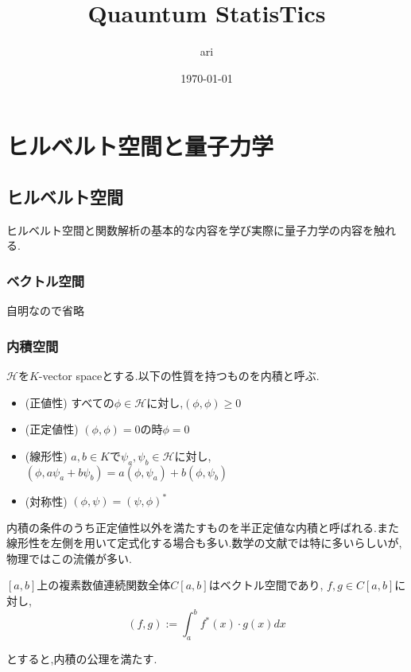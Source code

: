 \documentclass[uplatex]{jsbook}
\title{Quauntum StatisTics}
\author{ari}
\date{\today}
\begin{document}
\maketitle
\tableofcontents
\part{ヒルベルト空間と量子力学}
\chapter{ヒルベルト空間}
ヒルベルト空間と関数解析の基本的な内容を学び実際に量子力学の内容を触れる.
\section{ベクトル空間}
自明なので省略

\section{内積空間}

\begin{screen}
\begin{dfn}
 $\mathcal{H}$を$K$-vector spaceとする.以下の性質を持つものを内積と呼ぶ.
 \begin{itemize}
   \item (正値性) すべての$\phi \in \mathcal{H}$に対し,$(\phi, \phi) \ge 0$
   \item (正定値性) $(\phi, \phi) = 0$の時$\phi = 0$
   \item (線形性) $a,b \in K$で$\psi_a, \psi_b \in \mathcal{H}$に対し,$(\phi, a \psi_a + b\psi_b) = a(\phi, \psi_a) + b(\phi, \psi_b)$
   \item (対称性) $(\phi, \psi) = (\psi, \phi)^*$
 \end{itemize}
\end{dfn}
\end{screen}

\begin{rem}
  内積の条件のうち正定値性以外を満たすものを半正定値な内積と呼ばれる.また線形性を左側を用いて定式化する場合も多い.数学の文献では特に多いらしいが,物理ではこの流儀が多い.
\end{rem}


\begin{epl}
$[a, b]$上の複素数値連続関数全体$C[a,b]$はベクトル空間であり,
$f, g \in C[a, b]$に対し,
\begin{equation*}
 (f, g) :=  \int_a^b f^*(x) \cdot g(x) dx
\end{equation*}
\end{epl}
とすると,内積の公理を満たす.
\end{document}
